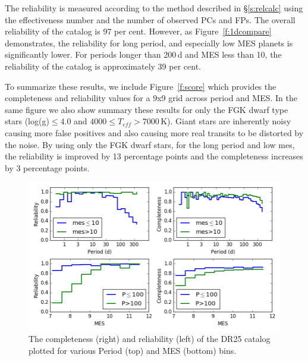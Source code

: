 The reliability is measured according to the method described in \S\ref{s:relcalc} using the effectiveness number and the number of observed PCs and FPs.  The overall reliability of the catalog is 97 per cent. However, as Figure~\ref{f:1dcompare} demonstrates, the reliability for long period, and especially low MES planets is significantly lower.  For periods longer than 200\,d and MES less than 10, the reliability of the catalog is approximately 39 per cent.

To summarize these results, we include Figure~\ref{f:score} which provides the completeness and reliability values for a 9x9 grid across period and MES. In the same figure we also show summary these results for only the FGK dwarf type stars (log(g)$\leq4.0$ and $4000 \leq T_{eff} > 7000$\,K). Giant stars are inherently noisy causing more false positives and also causing more real transits to be distorted by the noise.  By using only the FGK dwarf stars, for the long period and low mes, the reliability is improved by 13 percentage points  and the completeness increases by 3 percentage points.


\begin{figure}[h!]
 \begin{center}
  \includegraphics[width=1.0\linewidth]{fig-compRel1D-PerMes.png}
  \caption{\label{f:1dcomparel} The completeness (right) and reliability (left) of the DR25 catalog plotted for various Period (top) and MES (bottom) bins.}
 \end{center}
 \end{figure}


